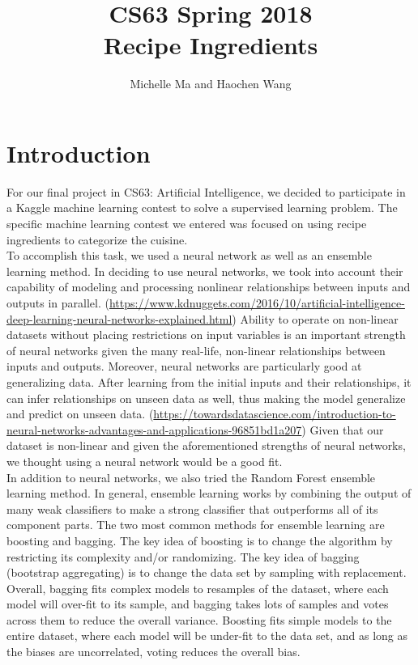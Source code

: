\documentclass[11pt]{article}
\title{CS63 Spring 2018\\Recipe Ingredients}
\author{Michelle Ma and Haochen Wang}
\date{}
\begin{document}
\maketitle

\section{Introduction}

For our final project in CS63: Artificial Intelligence, we decided to participate
in a Kaggle machine learning contest to solve a supervised learning problem. The
specific machine learning contest we entered was focused on using recipe ingredients
to categorize the cuisine. \\

To accomplish this task, we used a neural network as well as
an ensemble learning method. In deciding to use neural networks, we took into
account their capability of modeling and processing nonlinear relationships between
inputs and outputs in parallel.
(\url{https://www.kdnuggets.com/2016/10/artificial-intelligence-deep-learning-neural-networks-explained.html})
Ability to operate on non-linear datasets without placing restrictions on input variables
is an important strength of neural networks
given the many real-life, non-linear relationships between inputs and outputs. Moreover,
neural networks are particularly good at generalizing data. After learning from
the initial inputs and their relationships, it can infer relationships on
unseen data as well, thus making the model generalize and predict on unseen data.
(\url{https://towardsdatascience.com/introduction-to-neural-networks-advantages-and-applications-96851bd1a207})
Given that our dataset is non-linear and given the aforementioned strengths of
neural networks, we thought using a neural network would be a good fit.\\

In addition to neural networks, we also tried the Random Forest ensemble
learning method. In general, ensemble learning works by combining the output
of many weak classifiers to make a strong classifier that outperforms all of
its component parts. The two most common methods for ensemble learning are
boosting and bagging. The key idea of boosting is to change the algorithm
by restricting its complexity and/or randomizing. The key idea of bagging (bootstrap
aggregating) is to change the data set by sampling with replacement. Overall,
bagging fits complex models to resamples of the dataset, where each model will
over-fit to its sample, and bagging takes lots of samples and votes across them
to reduce the overall variance. Boosting fits simple models to the entire
dataset, where each model will be under-fit to the data set, and as long as
the biases are uncorrelated, voting reduces the overall bias. \\
\end{document}
